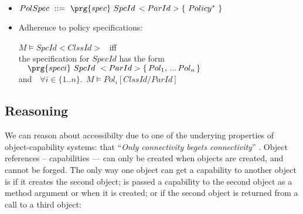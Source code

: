 {\begin{definition}
 \begin{itemize}
\item
$
PolSpec \  ::= \  \prg{spec}\ SpcId\,<ParId>\{\ Policy^*\ \}
$
\item
\noindent
Adherence to policy specifications:

$M  \models SpcId<ClssId>  $ \  iff  \\
the specification for $SpecId$  has the form\\
$\ \ \ \prg{speci}\ SpcId\  <ParId>\{\,Pol_1,\, ...\, Pol_n\, \}$\\
and
 $\ \ \ \forall i\!\in\! \{1..n\}. \ \  M  \models Pol_i[ClssId/ParId]$ 

\end{itemize}
\end{definition}










 \subsection{Reasoning}
 



We can reason about accessibilty due to one of the underying
properties of object-capability systems: that ``\textit{Only
  connectivity begets connectivity}'' \cite{MillerPhD}.  Object
references -- capabilities --- can only be created when objects are
created, and cannot be forged. The only way one object can get a
capability to another object is if it creates the second object; is
passed a capability to the second object as a method argument or when
it is created; or if the second object is returned from a call to a
third object:


}
